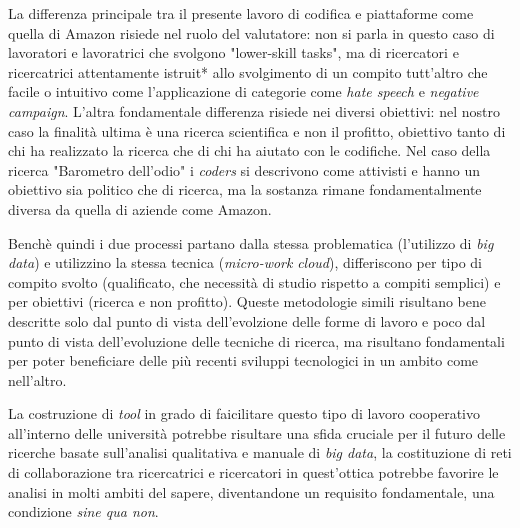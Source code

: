 La differenza principale tra il presente lavoro di codifica e piattaforme come quella di Amazon risiede nel ruolo del valutatore: non si parla in questo caso di lavoratori e lavoratrici che svolgono "lower-skill tasks", ma di ricercatori e ricercatrici attentamente istruit* allo svolgimento di un compito tutt'altro che facile o intuitivo come l'applicazione di categorie come \textit{hate speech} e \textit{negative campaign}. L'altra fondamentale differenza risiede nei diversi obiettivi: nel nostro caso la finalità ultima è una ricerca scientifica e non il profitto, obiettivo tanto di chi ha realizzato la ricerca che di chi ha aiutato con le codifiche. Nel caso della ricerca "Barometro dell'odio" i \textit{coders} si descrivono come attivisti e hanno un obiettivo sia politico che di ricerca, ma la sostanza rimane fondamentalmente diversa da quella di aziende come Amazon.

Benchè quindi i due processi partano dalla stessa problematica (l'utilizzo di \textit{big data}) e utilizzino la stessa tecnica (\textit{micro-work} \textit{cloud}), differiscono per tipo di compito svolto (qualificato, che necessità di studio rispetto a compiti semplici) e per obiettivi (ricerca e non profitto). Queste metodologie simili risultano bene descritte solo dal punto di vista dell'evolzione delle forme di lavoro e poco dal punto di vista dell'evoluzione delle tecniche di ricerca, ma risultano fondamentali per poter beneficiare delle più recenti sviluppi tecnologici in un ambito come nell'altro.

La costruzione di \textit{tool} in grado di faicilitare questo tipo di lavoro cooperativo all'interno delle università potrebbe risultare una sfida cruciale per il futuro delle ricerche basate sull'analisi qualitativa e manuale di \textit{big data}, la costituzione di reti di collaborazione tra ricercatrici e ricercatori in quest'ottica potrebbe favorire le analisi in molti ambiti del sapere, diventandone un requisito fondamentale, una condizione \textit{sine qua non}.